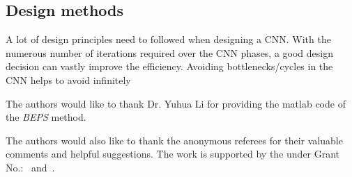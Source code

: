 \documentclass[sigconf]{acmart}
\begin{document}
\subsection{Design methods}
A lot of design principles need to followed when designing a CNN. With the numerous number of iterations required over the CNN phases, a good design decision can vastly improve the efficiency. Avoiding bottlenecks/cycles in the CNN helps to avoid infinitely

\begin{acks}

  The authors would like to thank Dr. Yuhua Li for providing the
  matlab code of the \textit{BEPS} method.

  The authors would also like to thank the anonymous referees for
  their valuable comments and helpful suggestions. The work is
  supported by the  under Grant
  No.:~
  and~.

\end{acks}


 
\end{document}
